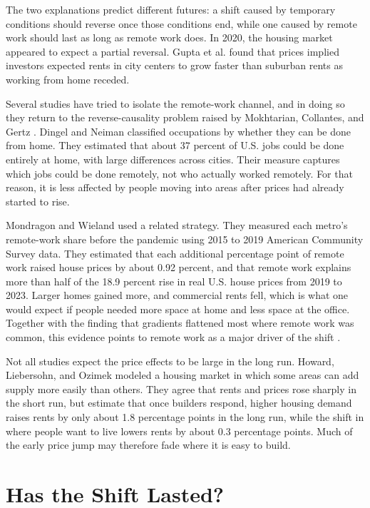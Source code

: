 \documentclass[11pt]{article}
\begin{document}
The two explanations predict different futures: a shift caused by temporary conditions should reverse once those conditions end, while one caused by remote work should last as long as remote work does. In 2020, the housing market appeared to expect a partial reversal. Gupta et al. \cite{gupta2022flattening} found that prices implied investors expected rents in city centers to grow faster than suburban rents as working from home receded.

Several studies have tried to isolate the remote-work channel, and in doing so they return to the reverse-causality problem raised by Mokhtarian, Collantes, and Gertz \cite{mokhtarian2004telecommuting}. Dingel and Neiman \cite{dingel2020jobs} classified occupations by whether they can be done from home. They estimated that about 37 percent of U.S. jobs could be done entirely at home, with large differences across cities. Their measure captures which jobs could be done remotely, not who actually worked remotely. For that reason, it is less affected by people moving into areas after prices had already started to rise.

Mondragon and Wieland \cite{mondragon2022housing} used a related strategy. They measured each metro's remote-work share before the pandemic using 2015 to 2019 American Community Survey data. They estimated that each additional percentage point of remote work raised house prices by about 0.92 percent, and that remote work explains more than half of the 18.9 percent rise in real U.S. house prices from 2019 to 2023. Larger homes gained more, and commercial rents fell, which is what one would expect if people needed more space at home and less space at the office. Together with the finding that gradients flattened most where remote work was common, this evidence points to remote work as a major driver of the shift \cite{gupta2022flattening,mondragon2022housing}.

Not all studies expect the price effects to be large in the long run. Howard, Liebersohn, and Ozimek \cite{howard2023short} modeled a housing market in which some areas can add supply more easily than others. They agree that rents and prices rose sharply in the short run, but estimate that once builders respond, higher housing demand raises rents by only about 1.8 percentage points in the long run, while the shift in where people want to live lowers rents by about 0.3 percentage points. Much of the early price jump may therefore fade where it is easy to build.

\section{Has the Shift Lasted?}
\end{document}
